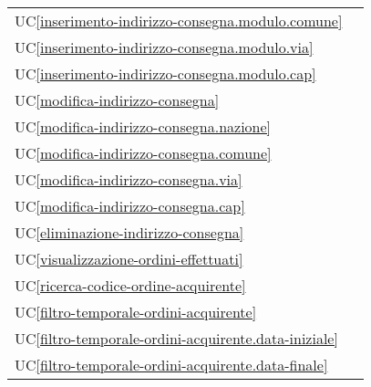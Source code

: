 \begin{longtable}{C{6cm} C{6cm}}
    UC\ref{inserimento-indirizzo-consegna.modulo.comune} &  \\

	UC\ref{inserimento-indirizzo-consegna.modulo.via} &  \\

    UC\ref{inserimento-indirizzo-consegna.modulo.cap} &  \\

	UC\ref{modifica-indirizzo-consegna} &  \\

    UC\ref{modifica-indirizzo-consegna.nazione} &  \\

	UC\ref{modifica-indirizzo-consegna.comune} &  \\

    UC\ref{modifica-indirizzo-consegna.via} &  \\

	UC\ref{modifica-indirizzo-consegna.cap} &  \\

    UC\ref{eliminazione-indirizzo-consegna} &  \\

	UC\ref{visualizzazione-ordini-effettuati} &   \\

	UC\ref{ricerca-codice-ordine-acquirente} &  \\

    UC\ref{filtro-temporale-ordini-acquirente} &  \\

	UC\ref{filtro-temporale-ordini-acquirente.data-iniziale} &  \\

    UC\ref{filtro-temporale-ordini-acquirente.data-finale} &  \\


\end{longtable}
